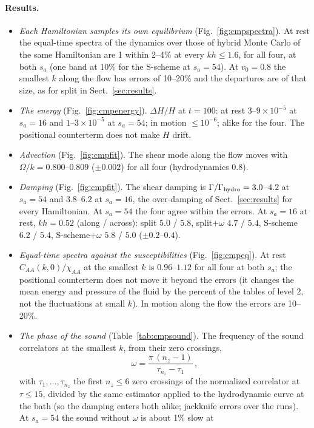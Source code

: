 \documentclass[11pt,aps,preprint,nofootinbib,superscriptaddress,tightenlines]{revtex4-2}
\def\st{\begin{equation}}
\def\stp{\end{equation}}
\def\Sect#1{Sect.~\ref{#1}}
\def\Fig#1{Fig.~\ref{#1}}
\let\oldparagraph\paragraph
\renewcommand{\paragraph}{\par\bigskip\oldparagraph}
\begin{document}
\paragraph{Results.}
\begin{itemize}
\item \emph{Each Hamiltonian samples its own equilibrium} (\Fig{fig:cmpspectra}).  At rest the equal-time spectra of the dynamics over those of hybrid Monte
  Carlo of the same Hamiltonian are 1 within 2--4\% at every $kh\le1.6$, for all four, at both $s_a$ (one band at 10\% for the S-scheme at $s_a=54$).  At
  $v_0=0.8$ the smallest $k$ along the flow has errors of 10--20\% and the departures are of that size, as for split in \Sect{sec:results}.
\item \emph{The energy} (\Fig{fig:cmpenergy}).  $\Delta H/H$ at $t=100$: at rest $3$--$9\times10^{-5}$ at $s_a=16$ and $1$--$3\times10^{-5}$ at $s_a=54$; in
  motion $\le10^{-6}$; alike for the four.  The positional counterterm does not make $H$ drift.
\item \emph{Advection} (\Fig{fig:cmpfit}).  The shear mode along the flow moves with $\Omega/k=0.800$--$0.809$ ($\pm0.002$) for all four (hydrodynamics 0.8).
\item \emph{Damping} (\Fig{fig:cmpfit}).  The shear damping is $\Gamma/\Gamma_{\rm hydro}=3.0$--$4.2$ at $s_a=54$ and $3.8$--$6.2$ at $s_a=16$, the
  over-damping of \Sect{sec:results} for every Hamiltonian.  At $s_a=54$ the four agree within the errors.  At $s_a=16$ at rest, $kh=0.52$ (along / across):
  split $5.0$ / $5.8$, split$+\omega$ $4.7$ / $5.4$, S-scheme $6.2$ / $5.4$, S-scheme$+\omega$ $5.8$ / $5.0$ ($\pm0.2$--$0.4$).
\item \emph{Equal-time spectra against the susceptibilities} (\Fig{fig:cmpeq}).  At rest $C_{AA}(k,0)/\chi_{AA}$ at the smallest $k$ is $0.96$--$1.12$ for all
  four at both $s_a$; the positional counterterm does not move it beyond the errors (it changes the mean energy and pressure of the fluid by the
  percent of the tables of level 2, not the fluctuations at small $k$).  In motion along the flow the errors are 10--20\%.
\item \emph{The phase of the sound} (Table~\ref{tab:cmpsound}).  The frequency of the sound correlators at the smallest $k$, from their zero crossings,
  \st
  \omega=\frac{\pi\,(n_z-1)}{\tau_{n_z}-\tau_1}\,,
  \stp
  with $\tau_1,\dots,\tau_{n_z}$ the first $n_z\le6$ zero crossings of the normalized correlator at $\tau\le15$, divided by the same estimator applied to the
  hydrodynamic curve at the bath (so the damping enters both alike; jackknife errors over the runs).  At $s_a=54$ the sound without $\omega$ is about 1\% slow at

\end{itemize}
\end{document}
